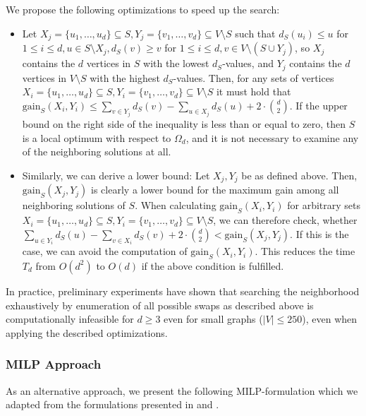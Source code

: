 \documentclass[draft,final]{vutinfth} %
\begin{document}
We propose the following optimizations to speed up the search: 
\begin{itemize}
    \item Let $X_j = \{u_1, \dots, u_d\} \subseteq S, Y_j = \{v_1, \dots, v_d\} \subseteq V \setminus S$ such that $d_S(u_i) \leq u$ for $1 \leq i \leq d, u \in S \setminus X_j, d_S(v) \geq v$ for $1 \leq i \leq d, v \in V \setminus (S \cup Y_j)$, so $X_j$ contains the $d$ vertices in $S$ with the lowest $d_S$-values, and $Y_j$ contains the $d$ vertices in $V\setminus S$ with the highest $d_S$-values.  
    Then, for any sets of vertices $X_i = \{u_1, \dots, u_d\} \subseteq S, Y_i = \{v_1, \dots, v_d\} \subseteq V \setminus S$ it must hold that $\mathrm{gain}_S(X_i, Y_i) \leq \sum_{v \in Y_j} d_S(v) - \sum_{u \in X_j} d_S(u) + 2 \cdot \binom{d}{2}$. If the upper bound on the right side of the inequality is less than or equal to zero, then $S$ is a local optimum with respect to $\Omega_d$, and it is not necessary to examine any of the neighboring solutions at all. 
    \item Similarly, we can derive a lower bound: Let $X_j, Y_j$ be as defined above. Then, $\mathrm{gain}_S(X_j, Y_j)$ is clearly a lower bound for the maximum gain among all neighboring solutions of $S$. When calculating $\mathrm{gain}_S(X_i, Y_i)$ for arbitrary sets $X_i = \{u_1, \dots, u_d\} \subseteq S, Y_i = \{v_1, \dots, v_d\} \subseteq V \setminus S$, we can therefore check, whether $\sum_{u \in Y_i} d_S(u) - \sum_{v \in X_i} d_S(v) + 2 \cdot \binom{d}{2} < \mathrm{gain}_S(X_j, Y_j)$. If this is the case, we can avoid the computation of $\mathrm{gain}_S(X_i, Y_i)$. This reduces the time $T_d$ from $O(d^2)$ to $O(d)$ if the above condition is fulfilled. 
\end{itemize}

In practice, preliminary experiments have shown that searching the neighborhood exhaustively by enumeration of all possible swaps as described above is computationally infeasible for $d \geq 3$ even for small graphs ($|V| \leq 250$), even when applying the described optimizations. 

\subsubsection{MILP Approach}

As an alternative approach, we present the following MILP-formulation which we adapted from the formulations presented in \cite{pattillo_maximum_2013} and \cite{VeremyevPBP16}.
 
\end{document}
